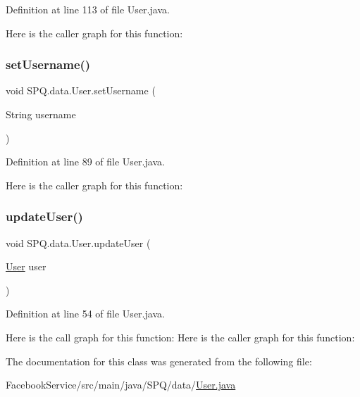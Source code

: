 Definition at line 113 of file User.\+java.

Here is the caller graph for this function\+:
\mbox{\label{class_s_p_q_1_1data_1_1_user_ab173655f6fbe57a59cd0da8d0cfbed06}} 
\subsubsection{\texorpdfstring{set\+Username()}{setUsername()}}
{\footnotesize\ttfamily void S\+P\+Q.\+data.\+User.\+set\+Username (\begin{DoxyParamCaption}\item[{String}]{username }\end{DoxyParamCaption})}



Definition at line 89 of file User.\+java.

Here is the caller graph for this function\+:
\mbox{\label{class_s_p_q_1_1data_1_1_user_ac472400b9deed770cf6f3591dc9e2886}} 
\subsubsection{\texorpdfstring{update\+User()}{updateUser()}}
{\footnotesize\ttfamily void S\+P\+Q.\+data.\+User.\+update\+User (\begin{DoxyParamCaption}\item[{\mbox{\hyperlink{class_s_p_q_1_1data_1_1_user}{User}}}]{user }\end{DoxyParamCaption})}



Definition at line 54 of file User.\+java.

Here is the call graph for this function\+:
Here is the caller graph for this function\+:


The documentation for this class was generated from the following file\+:\begin{DoxyCompactItemize}
\item 
Facebook\+Service/src/main/java/\+S\+P\+Q/data/\mbox{\hyperlink{_facebook_service_2src_2main_2java_2_s_p_q_2data_2_user_8java}{User.\+java}}\end{DoxyCompactItemize}
